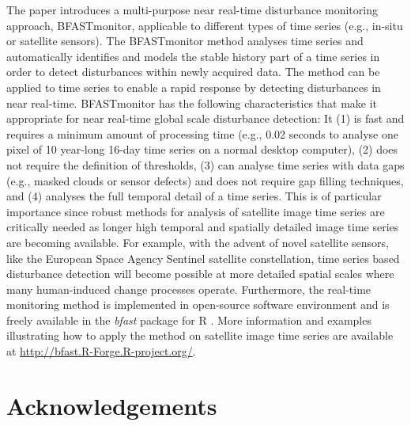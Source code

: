 \documentclass[authoryear,preprint,review,10pt]{elsarticle}
\begin{document}
The paper introduces a multi-purpose near real-time disturbance monitoring approach, BFASTmonitor, applicable to different types of time series (e.g., in-situ or satellite sensors). The BFASTmonitor method analyses time series and automatically identifies and models the stable history part of a time series in order to detect disturbances within newly acquired data. The method can be applied to time series to enable a rapid response by detecting disturbances in near real-time. BFASTmonitor has the following characteristics that make it appropriate for near real-time global scale disturbance detection: It (1) is fast and requires a minimum amount of processing time (e.g., 0.02 seconds to analyse one pixel of 10 year-long 16-day time series on a normal desktop computer), (2) does not require the definition of thresholds, (3) can analyse time series with data gaps (e.g., masked clouds or sensor defects) and does not require gap filling techniques, and (4) analyses the full temporal detail of a time series. This is of particular importance since robust methods for analysis of satellite image time series are critically needed as longer high temporal and spatially detailed image time series are becoming available. For example, with the advent of novel satellite sensors, like the European Space Agency Sentinel satellite constellation, time series based disturbance detection will become possible at more detailed spatial scales where many human-induced change processes operate. Furthermore, the real-time monitoring method is implemented in open-source software environment and is freely available in the \emph{bfast} package for {R} \citep{R}. More information and examples illustrating how to apply the method on satellite image time series are available at \url{http://bfast.R-Forge.R-project.org/}.





\section{Acknowledgements}
\end{document}
